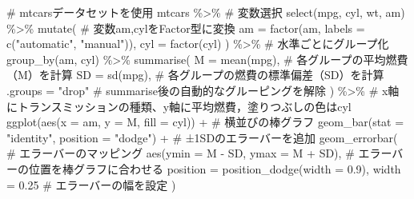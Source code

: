 \documentclass[
  a4paper,
]{ltjsbook}
\newenvironment{Shaded}{\begin{snugshade}}{\end{snugshade}}
\newcommand{\AttributeTok}[1]{\textcolor[rgb]{0.40,0.45,0.13}{#1}}
\newcommand{\CommentTok}[1]{\textcolor[rgb]{0.37,0.37,0.37}{#1}}
\newcommand{\FloatTok}[1]{\textcolor[rgb]{0.68,0.00,0.00}{#1}}
\newcommand{\FunctionTok}[1]{\textcolor[rgb]{0.28,0.35,0.67}{#1}}
\newcommand{\NormalTok}[1]{\textcolor[rgb]{0.00,0.23,0.31}{#1}}
\newcommand{\SpecialCharTok}[1]{\textcolor[rgb]{0.37,0.37,0.37}{#1}}
\newcommand{\StringTok}[1]{\textcolor[rgb]{0.13,0.47,0.30}{#1}}
\begin{document}
\begin{Shaded}
\begin{Highlighting}[]
\CommentTok{\# mtcarsデータセットを使用}
\NormalTok{mtcars }\SpecialCharTok{\%\textgreater{}\%}
  \CommentTok{\# 変数選択}
  \FunctionTok{select}\NormalTok{(mpg, cyl, wt, am) }\SpecialCharTok{\%\textgreater{}\%}
  \FunctionTok{mutate}\NormalTok{(}
    \CommentTok{\# 変数am,cylをFactor型に変換}
    \AttributeTok{am =} \FunctionTok{factor}\NormalTok{(am, }\AttributeTok{labels =} \FunctionTok{c}\NormalTok{(}\StringTok{"automatic"}\NormalTok{, }\StringTok{"manual"}\NormalTok{)),}
    \AttributeTok{cyl =} \FunctionTok{factor}\NormalTok{(cyl)}
\NormalTok{  ) }\SpecialCharTok{\%\textgreater{}\%}
  \CommentTok{\# 水準ごとにグループ化}
  \FunctionTok{group\_by}\NormalTok{(am, cyl) }\SpecialCharTok{\%\textgreater{}\%}
  \FunctionTok{summarise}\NormalTok{(}
    \AttributeTok{M =} \FunctionTok{mean}\NormalTok{(mpg), }\CommentTok{\# 各グループの平均燃費（M）を計算}
    \AttributeTok{SD =} \FunctionTok{sd}\NormalTok{(mpg), }\CommentTok{\# 各グループの燃費の標準偏差（SD）を計算}
    \AttributeTok{.groups =} \StringTok{"drop"} \CommentTok{\# summarise後の自動的なグルーピングを解除}
\NormalTok{  ) }\SpecialCharTok{\%\textgreater{}\%}
  \CommentTok{\# x軸にトランスミッションの種類、y軸に平均燃費，塗りつぶしの色はcyl}
  \FunctionTok{ggplot}\NormalTok{(}\FunctionTok{aes}\NormalTok{(}\AttributeTok{x =}\NormalTok{ am, }\AttributeTok{y =}\NormalTok{ M, }\AttributeTok{fill =}\NormalTok{ cyl)) }\SpecialCharTok{+}
  \CommentTok{\# 横並びの棒グラフ}
  \FunctionTok{geom\_bar}\NormalTok{(}\AttributeTok{stat =} \StringTok{"identity"}\NormalTok{, }\AttributeTok{position =} \StringTok{"dodge"}\NormalTok{) }\SpecialCharTok{+}
  \CommentTok{\# ±1SDのエラーバーを追加}
  \FunctionTok{geom\_errorbar}\NormalTok{(}
    \CommentTok{\# エラーバーのマッピング}
    \FunctionTok{aes}\NormalTok{(}\AttributeTok{ymin =}\NormalTok{ M }\SpecialCharTok{{-}}\NormalTok{ SD, }\AttributeTok{ymax =}\NormalTok{ M }\SpecialCharTok{+}\NormalTok{ SD),}
    \CommentTok{\# エラーバーの位置を棒グラフに合わせる}
    \AttributeTok{position =} \FunctionTok{position\_dodge}\NormalTok{(}\AttributeTok{width =} \FloatTok{0.9}\NormalTok{),}
    \AttributeTok{width =} \FloatTok{0.25} \CommentTok{\# エラーバーの幅を設定}
\NormalTok{  )}
\end{Highlighting}
\end{Shaded}
\end{document}
